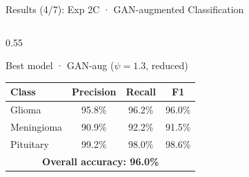 \documentclass[aspectratio=169]{beamer}
\begin{document}
\begin{frame}{Results (4/7): Exp 2C · GAN-augmented Classification}
\begin{columns}
\begin{column}{0.55\textwidth}
      \vspace{0.4em}
      \begin{exampleblock}{\centering Best model · GAN-aug ($\psi=1.3$, reduced)\hfill}
        \begin{center}
        \scriptsize
        \begin{tabular*}{0.95\linewidth}{@{\extracolsep{\fill}}lccc}
          \toprule
          Class       & Precision & Recall & F1 \\
          \midrule
          Glioma      & 95.8\%    & 96.2\% & 96.0\% \\
          Meningioma  & 90.9\%    & 92.2\% & 91.5\% \\
          Pituitary   & 99.2\%    & 98.0\% & 98.6\% \\
          \midrule
          \multicolumn{4}{c}{\textbf{Overall accuracy: 96.0\%}} \\
          \bottomrule
        \end{tabular*}
        \end{center}
      \end{exampleblock}
    \end{column}
  \end{columns}
\end{frame}
\end{document}
